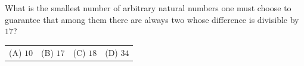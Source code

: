 What is the smallest number of arbitrary natural numbers one must choose to guarantee that among them there are always two whose difference is divisible by $17$?



\begin{tabular}{llll}
(A) $10$ & (B) $17$ & (C) $18$ & (D) $34$
\end{tabular}
